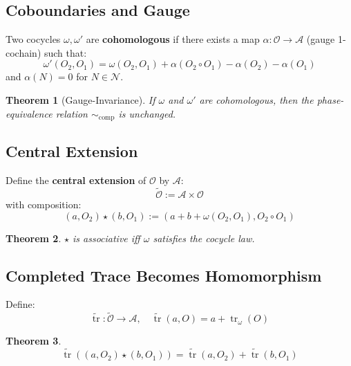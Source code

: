 \documentclass[12pt, oneside]{article}
\newtheorem{theorem}{Theorem}[section]
\DeclareMathOperator{\tr}{tr}
\newcommand{\N}{\mathcal{N}}
\newcommand{\A}{\mathcal{A}}
\newcommand{\Opr}{\mathcal{O}}
\begin{document}
\subsection{Coboundaries and Gauge}

Two cocycles $\omega, \omega'$ are \textbf{cohomologous} if there exists a map $\alpha: \Opr \rightarrow \A$ (gauge 1-cochain) such that:
\begin{equation}
\omega'(O_2, O_1) = \omega(O_2, O_1) + \alpha(O_2 \circ O_1) - \alpha(O_2) - \alpha(O_1)
\end{equation}
and $\alpha(N) = 0$ for $N \in \N$.

\begin{theorem}[Gauge-Invariance]
If $\omega$ and $\omega'$ are cohomologous, then the phase-equivalence relation $\sim_{\text{comp}}$ is unchanged.
\end{theorem}

\subsection{Central Extension}

Define the \textbf{central extension} of $\Opr$ by $\A$:
\begin{equation}
\widetilde{\Opr} := \A \times \Opr
\end{equation}
with composition:
\begin{equation}
(a, O_2) \star (b, O_1) := (a + b + \omega(O_2, O_1), O_2 \circ O_1)
\end{equation}

\begin{theorem}
$\star$ is associative iff $\omega$ satisfies the cocycle law.
\end{theorem}

\subsection{Completed Trace Becomes Homomorphism}

Define:
\begin{equation}
\widetilde{\tr}: \widetilde{\Opr} \rightarrow \A, \quad \widetilde{\tr}(a, O) = a + \tr_\omega(O)
\end{equation}

\begin{theorem}
\begin{equation}
\widetilde{\tr}((a, O_2) \star (b, O_1)) = \widetilde{\tr}(a, O_2) + \widetilde{\tr}(b, O_1)
\end{equation}
\end{theorem}
\end{document}
